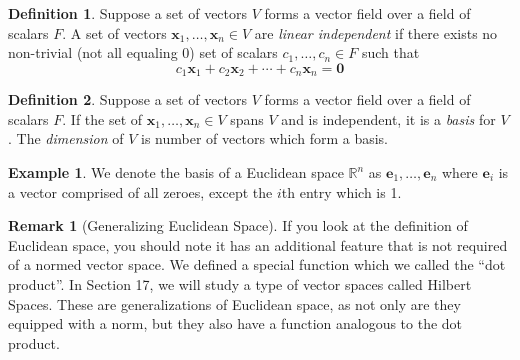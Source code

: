 \documentclass{article}
\newcommand{\R}{\mathbb{R}}
\newcommand{\x}{\mathbf{x}}
\theoremstyle{definition}
\newtheorem{definition}{Definition}[section]
\newtheorem{example}{Example}[section]
\newtheorem{remark}{Remark}[section]
\begin{document}
	\begin{definition}\label{def}
		Suppose a set of vectors $ V $ forms a vector field over a field of scalars $ F $. A set of vectors $ \x_1,\ldots,\x_n\in V $ are \textit{\color{red}linear independent} if there exists no non-trivial (not all equaling $ 0 $) set of scalars $ c_1,\ldots,c_n\in F $ such that $$ c_1\x_1 + c_2\x_2 +\cdots + c_n\x_n  = \mathbf{0}$$
	\end{definition}
	\begin{definition}\label{def}
		Suppose a set of vectors $ V $ forms a vector field over a field of scalars $ F $. If the set of $ \x_1,\ldots,\x_n\in V $ spans $ V $ and is independent, it is a \textit{\color{red}basis} for $ V $. The \textit{\color{red} dimension} of $ V $ is number of vectors which form a basis. 
	\end{definition}
	\begin{example}
		We denote the basis of a Euclidean space $ \R^n $ as $ {\mathbf e_1,\ldots,\mathbf e_n} $ where $ \mathbf{e}_i $ is a vector comprised of all zeroes, except the $ i $th entry which is 1. 
	\end{example}
	\begin{remark}[Generalizing Euclidean Space]
		If you look at the definition of Euclidean space, you should note it has an additional feature that is not required of a normed vector space. We defined a special function which we called the ``dot product''. In Section 17, we will study a type of vector spaces called Hilbert Spaces. These are 
		generalizations of Euclidean space, as not only are they equipped with a norm, but they also have a function analogous to the dot product. 
	\end{remark}
\end{document}
